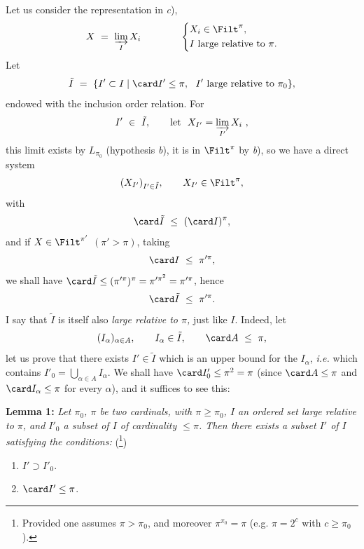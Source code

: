Let us consider the representation in \textit{c}),
\[
X \ = \ \varinjlim_{I} X_i \qquad\qquad
\left\{
\begin{aligned}
& X_i \in \Filt^{\pi},\\
& I \text{ large relative to } \pi.
\end{aligned}
\right.
\]
Let
\[
\tilde{I} \ = \ \{I' \subset I \mid \card I' \leq \pi,\ \ I' \text{ large relative to } \pi_0\},
\]
endowed with the inclusion order relation. For
\[
I' \ \in\ \tilde{I}, \qquad \text{let}\ \ X_{I'} = \varinjlim_{I'} X_i\ ,
\]
this limit exists by $L_{\pi_0}$ (hypothesis \textit{b}), it is in $\Filt^{\pi}$ by \textit{b}), so we have a direct system
\[
(X_{I'})_{I' \in \tilde{I}}, \qquad X_{I'} \in \Filt^{\pi},
\]
with
\[
\card \tilde{I} \ \leq\ (\card I)^{\pi},
\]
and if $X \in \Filt^{\pi'}$ $(\pi' > \pi)$, taking
\[
\card I \ \leq\ \pi'^{\pi},
\]
we shall have $\card \tilde{I} \leq (\pi'^{\pi})^{\pi} = \pi'^{\pi^2} = \pi'^{\pi}$, hence
\[
\card \tilde{I} \ \leq\ \pi'^{\pi}.
\]
I say that $\tilde{I}$ is itself also \textit{large relative to $\pi$,} just like $I$. Indeed,
let
\[
(I_\alpha)_{\alpha \in A}, \qquad I_\alpha \in \tilde{I}, \qquad \card A \ \leq\ \pi,
\]
let us prove that there exists $I' \in \tilde{I}$ which is an upper bound for the $I_\alpha$, \textit{i.e.} which contains $I'_0 = \bigcup_{\alpha \in A} I_\alpha$. We shall have $\card I'_0 \leq \pi^2 = \pi$ (since $\card A \leq \pi$ and $\card I_\alpha \leq \pi$ for every $\alpha$), and it suffices to see this:



\textbf{Lemma 1:} \textit{Let $\pi_0$, $\pi$ be two cardinals, with $\pi \geq \pi_0$, $I$ an ordered set large relative to $\pi$, and $I'_0$ a subset of $I$ of cardinality $\leq \pi$. Then there exists a subset $I'$ of $I$ satisfying the conditions:} (\footnote[40]{Provided one assumes $\pi > \pi_0$, and moreover $\pi^{\pi_0} = \pi$ (e.g. $\pi = 2^c$ with $c \geq \pi_0$).})

\begin{enumerate}
\item[a)] $I' \supset I'_0$.
\item[b)] $\card I' \leq \pi$.
\end{enumerate}